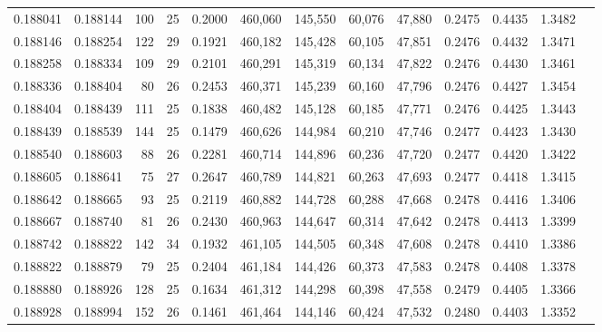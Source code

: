 \begin{tabular}{rrrrrrrrrrrrr}
0.188041 & 0.188144 & 100 &  25 &                                     0.2000 & 460,060 & 145,550 &  60,076 &  47,880 & 0.2475 & 0.4435 & 1.3482 \\
0.188146 & 0.188254 & 122 &  29 &                                     0.1921 & 460,182 & 145,428 &  60,105 &  47,851 & 0.2476 & 0.4432 & 1.3471 \\
0.188258 & 0.188334 & 109 &  29 &                                     0.2101 & 460,291 & 145,319 &  60,134 &  47,822 & 0.2476 & 0.4430 & 1.3461 \\
0.188336 & 0.188404 &  80 &  26 &                                     0.2453 & 460,371 & 145,239 &  60,160 &  47,796 & 0.2476 & 0.4427 & 1.3454 \\
0.188404 & 0.188439 & 111 &  25 &                                     0.1838 & 460,482 & 145,128 &  60,185 &  47,771 & 0.2476 & 0.4425 & 1.3443 \\
0.188439 & 0.188539 & 144 &  25 &                                     0.1479 & 460,626 & 144,984 &  60,210 &  47,746 & 0.2477 & 0.4423 & 1.3430 \\
0.188540 & 0.188603 &  88 &  26 &                                     0.2281 & 460,714 & 144,896 &  60,236 &  47,720 & 0.2477 & 0.4420 & 1.3422 \\
0.188605 & 0.188641 &  75 &  27 &                                     0.2647 & 460,789 & 144,821 &  60,263 &  47,693 & 0.2477 & 0.4418 & 1.3415 \\
0.188642 & 0.188665 &  93 &  25 &                                     0.2119 & 460,882 & 144,728 &  60,288 &  47,668 & 0.2478 & 0.4416 & 1.3406 \\
0.188667 & 0.188740 &  81 &  26 &                                     0.2430 & 460,963 & 144,647 &  60,314 &  47,642 & 0.2478 & 0.4413 & 1.3399 \\
0.188742 & 0.188822 & 142 &  34 &                                     0.1932 & 461,105 & 144,505 &  60,348 &  47,608 & 0.2478 & 0.4410 & 1.3386 \\
0.188822 & 0.188879 &  79 &  25 &                                     0.2404 & 461,184 & 144,426 &  60,373 &  47,583 & 0.2478 & 0.4408 & 1.3378 \\
0.188880 & 0.188926 & 128 &  25 &                                     0.1634 & 461,312 & 144,298 &  60,398 &  47,558 & 0.2479 & 0.4405 & 1.3366 \\
0.188928 & 0.188994 & 152 &  26 &                                     0.1461 & 461,464 & 144,146 &  60,424 &  47,532 & 0.2480 & 0.4403 & 1.3352 \\

\end{tabular}
